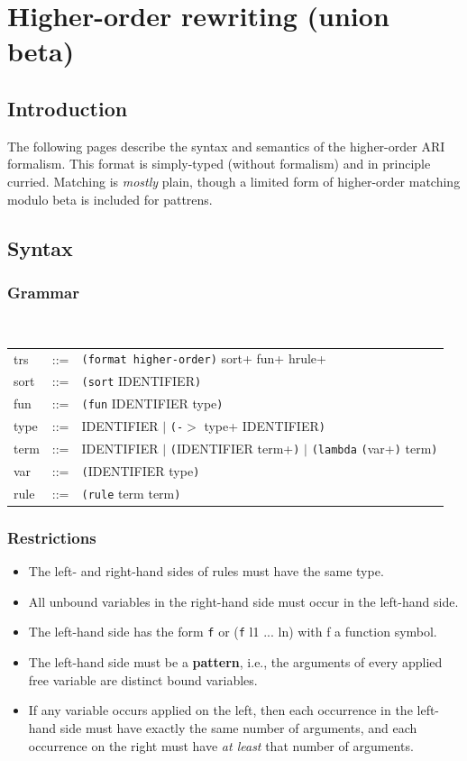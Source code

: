 \chapter{Higher-order rewriting (union beta)}

\section{Introduction}

The following pages describe the syntax and semantics of the higher-order ARI formalism.
This format is simply-typed (without formalism) and in principle curried.  Matching is
\emph{mostly} plain, though a limited form of higher-order matching modulo beta is
included for pattrens.

\section{Syntax}

\subsection{Grammar}
\ 

\begin{tabular}{lll}
trs & ::= & \texttt{(format higher-order)} sort+ fun+ hrule+ \\
sort & ::= & \texttt{(sort} IDENTIFIER\texttt{)} \\
fun & ::= & \texttt{(fun} IDENTIFIER type\texttt{)} \\
type & ::= & IDENTIFIER $|$ \texttt{(-}$\mathtt{>}$ type+ IDENTIFIER\texttt{)} \\
term & ::= & IDENTIFIER $|$ \texttt{(}IDENTIFIER term+\texttt{)} $|$ \texttt{(}\texttt{lambda} \texttt{(}var+\texttt{)} term\texttt{)} \\
var & ::= & \texttt{(}IDENTIFIER type\texttt{)} \\
rule & ::= & \texttt{(rule} term term\texttt{)} \\
\end{tabular}

\subsection{Restrictions}

\begin{itemize}
\item The left- and right-hand sides of rules must have the same type.
\item All unbound variables in the right-hand side must occur in the left-hand side.
\item The left-hand side has the form \texttt{f} or (\texttt{f} l1 ... ln) with f a function symbol.
\item The left-hand side must be a \textbf{pattern}, i.e., the arguments of every applied free variable are distinct bound variables.
\item If any variable occurs applied on the left, then each occurrence in the left-hand side must have exactly the same number of
  arguments, and each occurrence on the right must have \emph{at least} that number of arguments.
\end{itemize}

